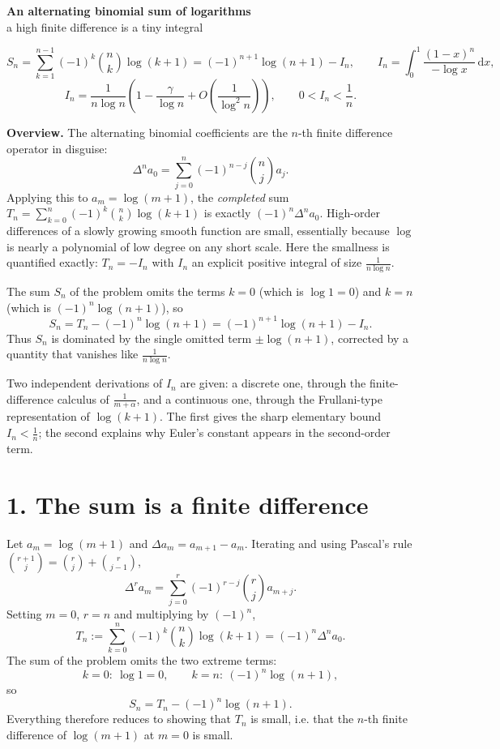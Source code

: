 \documentclass[12pt]{article}
\newcommand{\dd}{\,\mathrm{d}}
\newcommand{\Sn}{S_n}
\newcommand{\Tn}{T_n}
\newcommand{\In}{I_n}
\newcommand{\D}{\Delta}
\begin{document}
\begin{center}
{\Large\bfseries An alternating binomial sum of logarithms}\\[0.35em]
{\large a high finite difference is a tiny integral}
\end{center}

\[
\boxed{\displaystyle
\Sn=\sum_{k=1}^{n-1}(-1)^k\binom nk\log(k+1)
=(-1)^{n+1}\log(n+1)-\In,
\qquad
\In=\int_0^1\frac{(1-x)^n}{-\log x}\dd x,}
\]
\[
\boxed{\displaystyle
\In=\frac1{n\log n}\left(1-\frac{\gamma}{\log n}
+O\!\left(\frac1{\log^2 n}\right)\right),
\qquad 0<\In<\frac1n .}
\]

\textbf{Overview.}
The alternating binomial coefficients are the \(n\)-th finite difference
operator in disguise:
\[
\D^{n}a_0=\sum_{j=0}^{n}(-1)^{n-j}\binom nj a_j .
\]
Applying this to \(a_m=\log(m+1)\), the \emph{completed} sum
\(\Tn=\sum_{k=0}^{n}(-1)^k\binom nk\log(k+1)\) is exactly
\((-1)^n\D^n a_0\). High-order differences of a slowly growing smooth
function are small, essentially because \(\log\) is nearly a
polynomial of low degree on any short scale. Here the smallness is
quantified exactly: \(\Tn=-\In\) with \(\In\) an explicit positive
integral of size \(\frac1{n\log n}\).

The sum \(\Sn\) of the problem omits the terms \(k=0\) (which is
\(\log1=0\)) and \(k=n\) (which is \((-1)^n\log(n+1)\)), so
\[
\Sn=\Tn-(-1)^n\log(n+1)=(-1)^{n+1}\log(n+1)-\In .
\]
Thus \(\Sn\) is dominated by the single omitted term \(\pm\log(n+1)\),
corrected by a quantity that vanishes like \(\frac1{n\log n}\).

Two independent derivations of \(\In\) are given: a discrete one, through
the finite-difference calculus of \(\frac1{m+\alpha}\), and a continuous
one, through the Frullani-type representation of \(\log(k+1)\). The first
gives the sharp elementary bound \(\In<\frac1n\); the second explains why
Euler's constant appears in the second-order term.

\section*{1. The sum is a finite difference}

Let \(a_m=\log(m+1)\) and \(\D a_m=a_{m+1}-a_m\). Iterating and using
Pascal's rule \(\binom{r+1}{j}=\binom rj+\binom r{j-1}\),
\[
\D^{r}a_m=\sum_{j=0}^{r}(-1)^{r-j}\binom rj a_{m+j}.
\tag{1}
\]
Setting \(m=0\), \(r=n\) and multiplying by \((-1)^n\),
\[
\Tn:=\sum_{k=0}^{n}(-1)^k\binom nk\log(k+1)=(-1)^n\D^{n}a_0 .
\tag{2}
\]
The sum of the problem omits the two extreme terms:
\[
k=0:\ \log1=0,
\qquad
k=n:\ (-1)^n\log(n+1),
\]
so
\[
\boxed{\displaystyle \Sn=\Tn-(-1)^n\log(n+1).}
\tag{3}
\]
Everything therefore reduces to showing that \(\Tn\) is small, i.e. that
the \(n\)-th finite difference of \(\log(m+1)\) at \(m=0\) is small.
\end{document}
